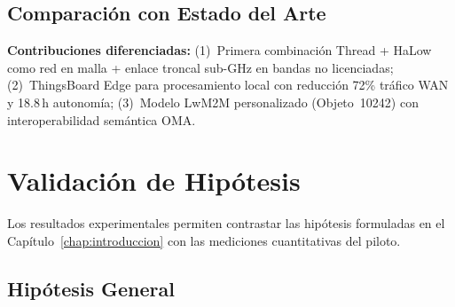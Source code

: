 \subsection{Comparación con Estado del Arte}
\label{sec:resultados-discusion-estado-arte}

\begin{table}[htbp]
\centering
\caption{Comparación cuantitativa con trabajos relacionados en arquitecturas IoT para AMI}
\label{tab:comparacion-estado-arte}
\end{table}

\textbf{Contribuciones diferenciadas:} (1)~Primera combinación Thread + HaLow como red en malla + enlace troncal sub-GHz en bandas no licenciadas; (2)~ThingsBoard Edge para procesamiento local con reducción 72\% tráfico WAN y 18.8\,h autonomía; (3)~Modelo LwM2M personalizado (Objeto~10242) con interoperabilidad semántica OMA.


\section{Validación de Hipótesis}
\label{sec:resultados-validacion-hipotesis}

Los resultados experimentales permiten contrastar las hipótesis formuladas en el Capítulo~\ref{chap:introduccion} con las mediciones cuantitativas del piloto.

\subsection{Hipótesis General}
\label{sec:resultados-hipotesis-general}

